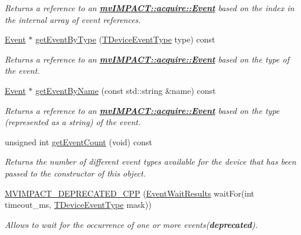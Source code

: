 \begin{DoxyCompactItemize}
\begin{DoxyCompactList}\small\item\em Returns a reference to an {\bfseries \hyperlink{classmv_i_m_p_a_c_t_1_1acquire_1_1_event}{mv\+I\+M\+P\+A\+C\+T\+::acquire\+::\+Event}} based on the index in the internal array of event references. \end{DoxyCompactList}\item 
\hyperlink{classmv_i_m_p_a_c_t_1_1acquire_1_1_event}{Event} $\ast$ \hyperlink{classmv_i_m_p_a_c_t_1_1acquire_1_1_event_sub_system_a1fd518a1695f14d8963f7bad4084f473}{get\+Event\+By\+Type} (\hyperlink{group___common_interface_ga0947eb7d6a73b9baab283cbf65cd8d6b}{T\+Device\+Event\+Type} type) const 
\begin{DoxyCompactList}\small\item\em Returns a reference to an {\bfseries \hyperlink{classmv_i_m_p_a_c_t_1_1acquire_1_1_event}{mv\+I\+M\+P\+A\+C\+T\+::acquire\+::\+Event}} based on the type of the event. \end{DoxyCompactList}\item 
\hyperlink{classmv_i_m_p_a_c_t_1_1acquire_1_1_event}{Event} $\ast$ \hyperlink{classmv_i_m_p_a_c_t_1_1acquire_1_1_event_sub_system_a9d73c821084f1376e221191cf4efaa57}{get\+Event\+By\+Name} (const std\+::string \&name) const 
\begin{DoxyCompactList}\small\item\em Returns a reference to an {\bfseries \hyperlink{classmv_i_m_p_a_c_t_1_1acquire_1_1_event}{mv\+I\+M\+P\+A\+C\+T\+::acquire\+::\+Event}} based on the type (represented as a string) of the event. \end{DoxyCompactList}\item 
unsigned int \hyperlink{classmv_i_m_p_a_c_t_1_1acquire_1_1_event_sub_system_a3f2509bbadd74548d28460908ad5754c}{get\+Event\+Count} (void) const 
\begin{DoxyCompactList}\small\item\em Returns the number of different event types available for the device that has been passed to the constructor of this object. \end{DoxyCompactList}\item 
\hyperlink{classmv_i_m_p_a_c_t_1_1acquire_1_1_event_sub_system_a18be5407d1c6b041f55f9854712e8c61}{M\+V\+I\+M\+P\+A\+C\+T\+\_\+\+D\+E\+P\+R\+E\+C\+A\+T\+E\+D\+\_\+\+C\+P\+P} (\hyperlink{classmv_i_m_p_a_c_t_1_1acquire_1_1_event_wait_results}{Event\+Wait\+Results} wait\+For(int timeout\+\_\+ms, \hyperlink{group___common_interface_ga0947eb7d6a73b9baab283cbf65cd8d6b}{T\+Device\+Event\+Type} mask))
\begin{DoxyCompactList}\small\item\em Allows to wait for the occurrence of one or more events({\bfseries deprecated}). \end{DoxyCompactList}\end{DoxyCompactItemize}


